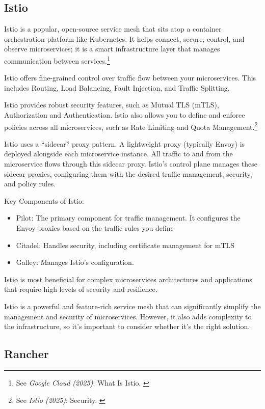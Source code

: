 \subsection{Istio}

Istio is a popular, open-source service mesh that sits atop a container
orchestration platform like Kubernetes. It helps connect, secure,
control, and observe microservices; it is a smart infrastructure layer
that manages communication between services.\footnote{See \textit{Google Cloud (2025)}: What Is Istio. \cite{whatIsIstio}}

Istio offers fine-grained control over traffic flow between your
microservices. This includes Routing, Load Balancing, Fault Injection,
and Traffic Splitting.

Istio provides robust security features, such as Mutual TLS (mTLS),
Authorization and Authentication. Istio also allows you to define and
enforce policies across all microservices, such as Rate Limiting and
Quota Management.\footnote{See \textit{Istio (2025)}: Security. \cite{istioSecurity}}

Istio uses a ``sidecar'' proxy pattern. A lightweight proxy (typically
Envoy) is deployed alongside each microservice instance. All traffic to
and from the microservice flows through this sidecar proxy. Istio's
control plane manages these sidecar proxies, configuring them with the
desired traffic management, security, and policy rules.

Key Components of Istio:

\begin{itemize}
	\item Pilot: The primary component for traffic management. It configures the Envoy proxies based on the traffic rules you define
	\item Citadel: Handles security, including certificate management for mTLS
	\item Galley: Manages Istio's configuration.
\end{itemize}

Istio is most beneficial for complex microservices architectures and
applications that require high levels of security and resilience.

Istio is a powerful and feature-rich service mesh that can significantly
simplify the management and security of microservices. However, it also
adds complexity to the infrastructure, so it's important to consider
whether it's the right solution.


\subsection{Rancher}

